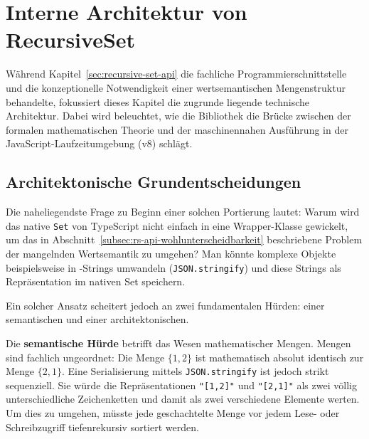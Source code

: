 
\section{Interne Architektur von RecursiveSet}
\label{sec:recursive-set-intern}

Während Kapitel~\ref{sec:recursive-set-api} die fachliche Programmierschnittstelle und die konzeptionelle Notwendigkeit einer wertsemantischen Mengenstruktur behandelte, fokussiert dieses Kapitel die zugrunde liegende technische Architektur. Dabei wird beleuchtet, wie die Bibliothek die Brücke zwischen der formalen mathematischen Theorie und der maschinennahen Ausführung in der JavaScript-Laufzeitumgebung (\gls{v8}) schlägt.


\subsection{Architektonische Grundentscheidungen}
\label{subsec:rs-intern-grundentscheidungen}

Die naheliegendste Frage zu Beginn einer solchen Portierung lautet: Warum wird das native \texttt{Set} von TypeScript nicht einfach in eine Wrapper-Klasse gewickelt, um das in Abschnitt~\ref{subsec:rs-api-wohlunterscheidbarkeit} beschriebene Problem der mangelnden Wertsemantik zu umgehen? Man könnte komplexe Objekte beispielsweise in -Strings umwandeln (\texttt{JSON.stringify}) und diese Strings als Repräsentation im nativen Set speichern. 

Ein solcher Ansatz scheitert jedoch an zwei fundamentalen Hürden: einer semantischen und einer architektonischen.

Die \textbf{semantische Hürde} betrifft das Wesen mathematischer Mengen. Mengen sind fachlich ungeordnet: Die Menge $\{1, 2\}$ ist mathematisch absolut identisch zur Menge $\{2, 1\}$. Eine Serialisierung mittels \texttt{JSON.stringify} ist jedoch strikt sequenziell. Sie würde die Repräsentationen \texttt{"[1,2]"} und \texttt{"[2,1]"} als zwei völlig unterschiedliche Zeichenketten und damit als zwei verschiedene Elemente werten. Um dies zu umgehen, müsste jede geschachtelte Menge vor jedem Lese- oder Schreibzugriff tiefenrekursiv sortiert werden.

